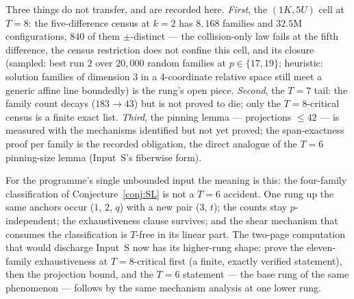 Three things do not transfer, and are recorded here. \emph{First}, the
$(1K,5U)$ cell at $T=8$: the five-difference census at $k=2$ has $8{,}168$
families and $32.5$M configurations, $840$ of them $\pm$-distinct --- the
collision-only law fails at the fifth difference, the census restriction
does not confine this cell, and its closure (sampled: best run $2$ over
$20{,}000$ random families at $p\in\{17,19\}$; heuristic: solution
families of dimension $3$ in a $4$-coordinate relative space still meet a
generic affine line boundedly) is the rung's open piece. \emph{Second},
the $T=7$ tail: the family count decays ($183\to43$) but is not proved
to die; only the $T=8$-critical census is a finite exact list.
\emph{Third}, the pinning lemma --- projections $\le42$ --- is measured
with the mechanisms identified but not yet proved; the span-exactness
proof per family is the recorded obligation, the direct analogue of the
$T=6$ pinning-size lemma (Input~S's fiberwise form).

For the programme's single unbounded input the meaning is this: the
four-family classification of Conjecture~\ref{conj:SL} is not a $T=6$
accident. One rung up the same anchors occur ($1$, $2$, $q$) with a new
pair ($3$, $t$); the counts stay $p$-independent; the exhaustiveness
clause survives; and the shear mechanism that consumes the
classification is $T$-free in its linear part. The two-page computation
that would discharge Input~S now has its higher-rung shape: prove the
eleven-family exhaustiveness at $T=8$-critical first (a finite, exactly
verified statement), then the projection bound, and the $T=6$ statement
--- the base rung of the same phenomenon --- follows by the same
mechanism analysis at one lower rung.
